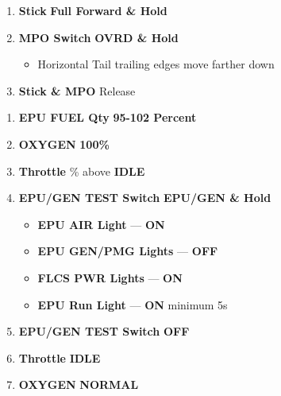 \begin{checklistenumerate}[resume]
    \begin{enumerate}
        \item \textbf{Stick} \dotfill \textbf{Full Forward \& Hold}
        \item \textbf{MPO Switch} \dotfill \textbf{OVRD \& Hold}
        \begin{itemize}
            \item Horizontal Tail trailing edges move farther down
        \end{itemize} 
        \item \textbf{Stick \& MPO} \dotfill Release
    \end{enumerate}
    \begin{enumerate}
        \item \textbf{EPU FUEL Qty} \dotfill \textbf{95-102 Percent}
        \item \textbf{OXYGEN} \dotfill \textbf{100\%}
        \item \textbf{Throttle} \% above \textbf{IDLE}
        \item \textbf{EPU/GEN TEST Switch} \dotfill \textbf{EPU/GEN \& Hold}
        \begin{itemize}
            \item \textbf{EPU AIR Light} --- \textbf{ON}
            \item \textbf{EPU GEN/PMG Lights} --- \textbf{OFF}
            \item \textbf{FLCS PWR Lights} --- \textbf{ON}
            \item \textbf{EPU Run Light} --- \textbf{ON} minimum 5s
        \end{itemize} 
        \item \textbf{EPU/GEN TEST Switch} \dotfill \textbf{OFF}
        \item \textbf{Throttle} \dotfill \textbf{IDLE}
        \item \textbf{OXYGEN} \dotfill \textbf{NORMAL}
    \end{enumerate}
\end{checklistenumerate}

\marginfigrestore